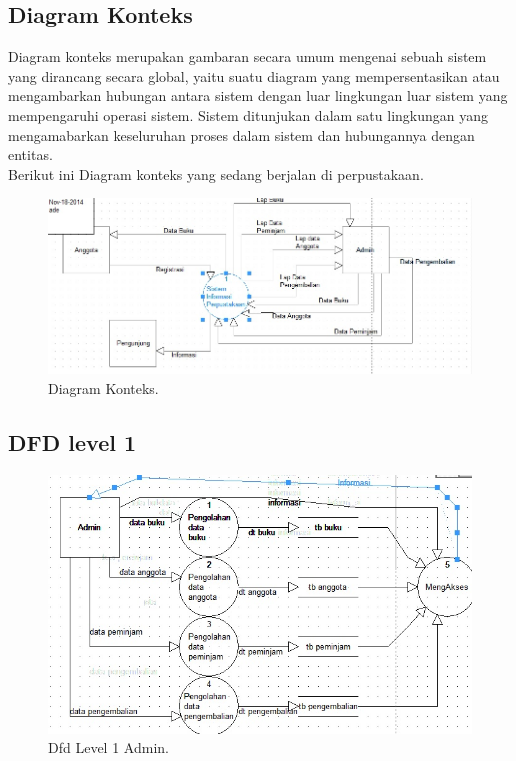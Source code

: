 \documentclass{jtetiproposalskripsi}
\begin{document}
\subsection{Diagram Konteks}
Diagram konteks merupakan gambaran secara umum mengenai sebuah sistem yang dirancang secara global, yaitu suatu diagram yang mempersentasikan atau mengambarkan hubungan antara sistem dengan luar lingkungan luar sistem yang mempengaruhi operasi sistem. Sistem ditunjukan dalam satu lingkungan yang mengamabarkan keseluruhan proses dalam sistem dan hubungannya dengan entitas.
\\
Berikut ini Diagram konteks yang sedang berjalan di perpustakaan.
\begin{figure}[ht!]
  \centering
    \includegraphics[width=1\textwidth]{gambar/DK}
    \caption{Diagram Konteks.}
    \label{DK}
\end{figure}
\newpage

\subsection{DFD level 1}
\begin{figure}[ht!]
  \centering
    \includegraphics[width=1\textwidth]{gambar/lvl1}
    \caption{Dfd Level 1 Admin.}
    \label{lvl1}
\end{figure}
\newpage
\end{document}
